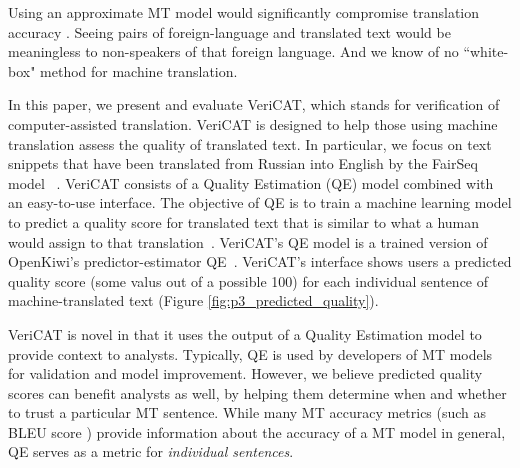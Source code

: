 Using an approximate MT model would significantly compromise translation accuracy%
. Seeing pairs of foreign-language and translated text would be meaningless to non-speakers of that foreign language. And we know of no ``white-box" method for machine translation. 


In this paper, we present and evaluate VeriCAT, which stands for verification of computer-assisted translation. VeriCAT is designed to help those using machine translation assess the quality of translated text. In particular, we focus on text snippets that have been translated from Russian into English by the FairSeq model ~\cite{ott-etal-2019-fairseq}. %
VeriCAT consists of a Quality Estimation (QE) model combined with an easy-to-use interface. The objective of QE is to train a machine learning model to predict a quality score for translated text that is similar to what a human would assign to that translation~\cite{mauvcec2019machine}. VeriCAT's QE model is a trained version of OpenKiwi’s predictor-estimator QE~\cite{Kim2017PredictorEstimatorUM}. VeriCAT's interface shows users a predicted quality score (some valus out of a possible 100) for each individual sentence of machine-translated text (Figure \ref{fig:p3_predicted_quality}). %

VeriCAT is novel in that it uses the output of a Quality Estimation model to provide context to analysts. Typically, QE is used by developers of MT models for validation and model improvement. However, we believe predicted quality scores can benefit analysts as well, by helping them determine when and whether to trust a particular MT sentence. While many MT accuracy metrics (such as BLEU score \cite{papineni-etal-2002-bleu}) provide information about the accuracy of a MT model in general, QE serves as a metric for \textit{individual sentences}. %


